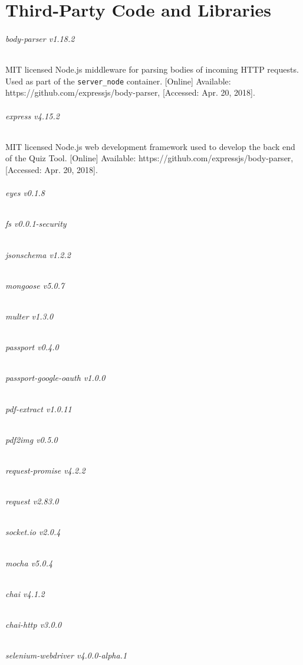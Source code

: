 \chapter{Third-Party Code and Libraries}
%
%
%
%
%

\subparagraph{body-parser v1.18.2}
MIT licensed Node.js middleware for parsing bodies of incoming HTTP requests. Used as part of the
\texttt{server\_node} container. [Online] Available: https://github.com/expressjs/body-parser, [Accessed: Apr. 20, 2018].

\subparagraph{express v4.15.2}
MIT licensed Node.js web development framework used to develop the back end of the Quiz Tool.
[Online] Available: https://github.com/expressjs/body-parser, [Accessed: Apr. 20, 2018].

\subparagraph{eyes v0.1.8}


\subparagraph{fs v0.0.1-security}
\subparagraph{jsonschema v1.2.2}
\subparagraph{mongoose v5.0.7}
\subparagraph{multer v1.3.0}
\subparagraph{passport v0.4.0}
\subparagraph{passport-google-oauth v1.0.0}
\subparagraph{pdf-extract v1.0.11}
\subparagraph{pdf2img v0.5.0}
\subparagraph{request-promise v4.2.2}
\subparagraph{request v2.83.0}
\subparagraph{socket.io v2.0.4}
\subparagraph{mocha v5.0.4}
\subparagraph{chai v4.1.2}
\subparagraph{chai-http v3.0.0}
\subparagraph{selenium-webdriver v4.0.0-alpha.1}

